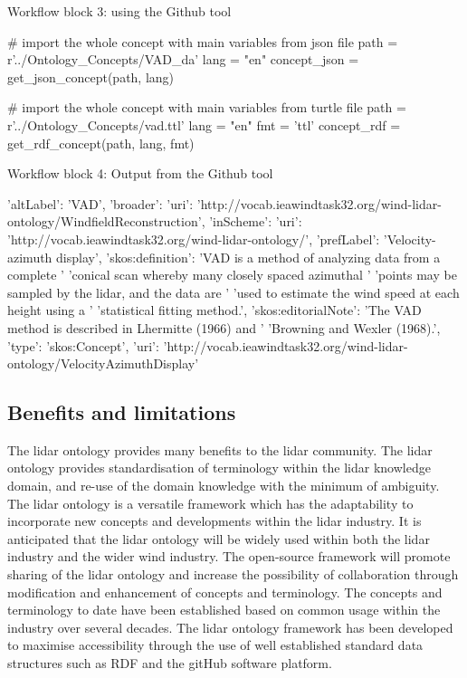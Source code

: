 \documentclass[remotesensing,article,submit,pdftex,moreauthors]{Definitions/mdpi}
\begin{document}
\begin{tcolorbox}
    Workflow block 3: using the Github tool
    \begin{python}
    # import the whole concept with main variables from json file
    path = r'../Ontology_Concepts/VAD_da'
    lang = "en"
    concept_json = get_json_concept(path, lang)

    # import the whole concept with main variables from turtle file
    path = r'../Ontology_Concepts/vad.ttl'
    lang = "en"
    fmt = 'ttl'
    concept_rdf = get_rdf_concept(path, lang, fmt)
\end{python}
\end{tcolorbox}

\begin{tcolorbox}
    Workflow block 4: Output from the Github tool
    \begin{python}
    {   'altLabel': 'VAD',
    'broader': {   'uri': 'http://vocab.ieawindtask32.org/wind-lidar-ontology/WindfieldReconstruction'},
    'inScheme': {'uri': 'http://vocab.ieawindtask32.org/wind-lidar-ontology/'},
    'prefLabel': 'Velocity-azimuth display',
    'skos:definition': 'VAD is a method of analyzing data from a complete '
                       'conical scan whereby many closely spaced azimuthal '
                       'points may be sampled by the lidar, and the data are '
                       'used to estimate the wind speed at each height using a '
                       'statistical fitting method.',
    'skos:editorialNote': 'The VAD method is described in Lhermitte (1966) and '
                          'Browning and Wexler (1968).',
    'type': 'skos:Concept',
    'uri': 'http://vocab.ieawindtask32.org/wind-lidar-ontology/VelocityAzimuthDisplay'}
\end{python}
\end{tcolorbox}


\subsection{Benefits and limitations}
The lidar ontology provides many benefits to the lidar community.
The lidar ontology provides standardisation of terminology within the lidar knowledge domain, and re-use of the domain knowledge with the minimum of ambiguity.
The lidar ontology is a versatile framework which has the adaptability to incorporate new concepts and developments within the lidar industry.
It is anticipated that the lidar ontology will be widely used within both the lidar industry and the wider wind industry.
The open-source framework will promote sharing of the lidar ontology and increase the possibility of collaboration through modification and enhancement of concepts and terminology. 
The concepts and terminology to date have been established based on common usage within the industry over several decades.
The lidar ontology framework has been developed to maximise accessibility through the use of well established standard data structures such as RDF and the gitHub software platform.
\end{document}

